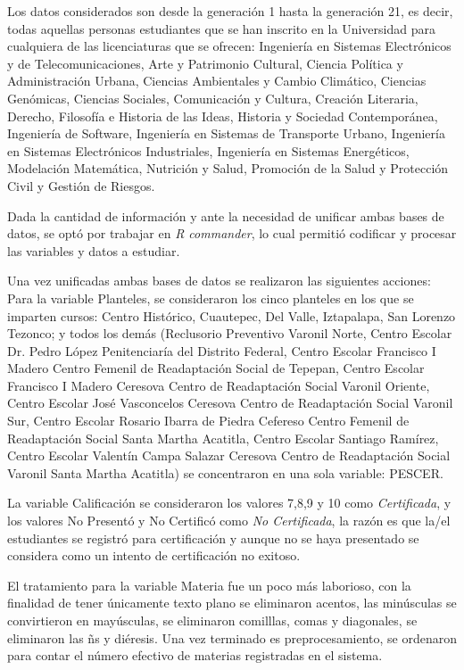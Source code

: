 \documentclass[12pt]{article}
\begin{document}
Los datos considerados son desde la generaci\'on 1 hasta la generaci\'on 21, es decir, todas aquellas personas estudiantes que se han inscrito en la Universidad para cualquiera de las licenciaturas que se ofrecen: Ingenier\'ia en Sistemas Electr\'onicos y de Telecomunicaciones, Arte y Patrimonio Cultural, Ciencia Pol\'itica y Administraci\'on Urbana, Ciencias Ambientales y Cambio Clim\'atico, Ciencias Gen\'omicas, Ciencias Sociales, Comunicaci\'on y Cultura, Creaci\'on Literaria, Derecho, Filosof\'ia e Historia de las Ideas, Historia y Sociedad Contempor\'anea, Ingenier\'ia de Software, Ingenier\'ia en Sistemas de Transporte Urbano, Ingenier\'ia en Sistemas Electr\'onicos Industriales, Ingenier\'ia en Sistemas Energ\'eticos, Modelaci\'on Matem\'atica, Nutrici\'on y Salud, Promoci\'on de la Salud y  Protecci\'on Civil y Gesti\'on de Riesgos.


Dada la cantidad de informaci\'on y ante la necesidad de unificar ambas bases de datos, se opt\'o por trabajar en \textit{R commander}, lo cual permiti\'o codificar y procesar las variables y datos a estudiar.


Una vez unificadas ambas bases de datos se realizaron las siguientes acciones:
Para la variable Planteles, se consideraron los cinco planteles en los que se imparten cursos: Centro Hist\'orico, Cuautepec, Del Valle, Iztapalapa, San Lorenzo Tezonco; y todos los dem\'as (Reclusorio Preventivo Varonil Norte, Centro Escolar Dr. Pedro L\'opez Penitenciar\'ia del Distrito Federal, Centro Escolar Francisco I Madero Centro Femenil de Readaptaci\'on Social de Tepepan, Centro Escolar Francisco I Madero Ceresova Centro de Readaptaci\'on Social Varonil Oriente, Centro Escolar Jos\'e Vasconcelos Ceresova Centro de Readaptaci\'on Social Varonil Sur, Centro Escolar Rosario Ibarra de Piedra Cefereso Centro Femenil de Readaptaci\'on Social Santa Martha Acatitla, Centro Escolar Santiago Ram\'irez, Centro Escolar Valent\'in Campa Salazar Ceresova Centro de Readaptaci\'on Social Varonil Santa Martha Acatitla) se concentraron en una sola variable: PESCER.

La variable Calificaci\'on se consideraron los valores 7,8,9 y 10 como \textit{Certificada}, y los valores No Present\'o y No Certific\'o como \textit{No Certificada}, la raz\'on es que la/el estudiantes se registr\'o para certificaci\'on y aunque no se haya presentado se considera como un intento de certificaci\'on no exitoso.

                  
El tratamiento para la variable Materia fue un poco m\'as laborioso, con la finalidad de tener \'unicamente texto plano se eliminaron acentos, las min\'usculas se convirtieron en may\'usculas, se eliminaron comilllas, comas y diagonales, se eliminaron las \~ns y di\'eresis. Una vez terminado es preprocesamiento, se ordenaron para contar el n\'umero efectivo de materias registradas en el sistema.
\end{document}
